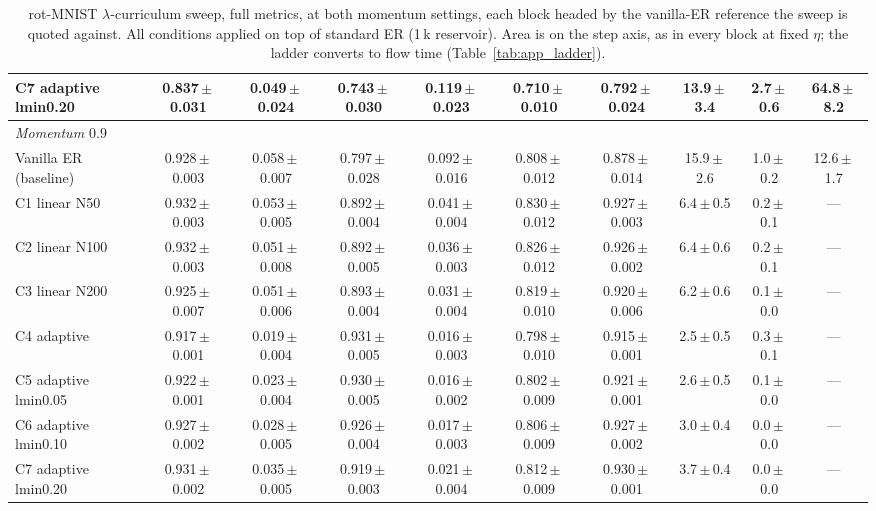 \begin{table}[H]
{\begin{tabular}{l ccc cc c cc c}
            C7 adaptive lmin0.20  & 0.837\,$\pm$\,0.031 & 0.049\,$\pm$\,0.024 & 0.743\,$\pm$\,0.030 & 0.119\,$\pm$\,0.023 & 0.710\,$\pm$\,0.010 & 0.792\,$\pm$\,0.024 & 13.9\,$\pm$\,3.4 & 2.7\,$\pm$\,0.6 & 64.8\,$\pm$\,8.2   \\
            \hline
            \multicolumn{10}{l}{\emph{Momentum $0.9$}}                                                                                                                                                                          \\
            Vanilla ER (baseline) & 0.928\,$\pm$\,0.003 & 0.058\,$\pm$\,0.007 & 0.797\,$\pm$\,0.028 & 0.092\,$\pm$\,0.016 & 0.808\,$\pm$\,0.012 & 0.878\,$\pm$\,0.014 & 15.9\,$\pm$\,2.6 & 1.0\,$\pm$\,0.2 & 12.6\,$\pm$\,1.7   \\
            C1 linear N50         & 0.932\,$\pm$\,0.003 & 0.053\,$\pm$\,0.005 & 0.892\,$\pm$\,0.004 & 0.041\,$\pm$\,0.004 & 0.830\,$\pm$\,0.012 & 0.927\,$\pm$\,0.003 & 6.4\,$\pm$\,0.5  & 0.2\,$\pm$\,0.1 & ---                \\
            C2 linear N100        & 0.932\,$\pm$\,0.003 & 0.051\,$\pm$\,0.008 & 0.892\,$\pm$\,0.005 & 0.036\,$\pm$\,0.003 & 0.826\,$\pm$\,0.012 & 0.926\,$\pm$\,0.002 & 6.4\,$\pm$\,0.6  & 0.2\,$\pm$\,0.1 & ---                \\
            C3 linear N200        & 0.925\,$\pm$\,0.007 & 0.051\,$\pm$\,0.006 & 0.893\,$\pm$\,0.004 & 0.031\,$\pm$\,0.004 & 0.819\,$\pm$\,0.010 & 0.920\,$\pm$\,0.006 & 6.2\,$\pm$\,0.6  & 0.1\,$\pm$\,0.0 & ---                \\
            C4 adaptive           & 0.917\,$\pm$\,0.001 & 0.019\,$\pm$\,0.004 & 0.931\,$\pm$\,0.005 & 0.016\,$\pm$\,0.003 & 0.798\,$\pm$\,0.010 & 0.915\,$\pm$\,0.001 & 2.5\,$\pm$\,0.5  & 0.3\,$\pm$\,0.1 & ---                \\
            C5 adaptive lmin0.05  & 0.922\,$\pm$\,0.001 & 0.023\,$\pm$\,0.004 & 0.930\,$\pm$\,0.005 & 0.016\,$\pm$\,0.002 & 0.802\,$\pm$\,0.009 & 0.921\,$\pm$\,0.001 & 2.6\,$\pm$\,0.5  & 0.1\,$\pm$\,0.0 & ---                \\
            C6 adaptive lmin0.10  & 0.927\,$\pm$\,0.002 & 0.028\,$\pm$\,0.005 & 0.926\,$\pm$\,0.004 & 0.017\,$\pm$\,0.003 & 0.806\,$\pm$\,0.009 & 0.927\,$\pm$\,0.002 & 3.0\,$\pm$\,0.4  & 0.0\,$\pm$\,0.0 & ---                \\
            C7 adaptive lmin0.20  & 0.931\,$\pm$\,0.002 & 0.035\,$\pm$\,0.005 & 0.919\,$\pm$\,0.003 & 0.021\,$\pm$\,0.004 & 0.812\,$\pm$\,0.009 & 0.930\,$\pm$\,0.001 & 3.7\,$\pm$\,0.4  & 0.0\,$\pm$\,0.0 & ---                \\
            \hline
        \end{tabular}%
    }
    \caption{rot-MNIST $\lambda$-curriculum sweep, full metrics, at both momentum settings, each block headed by the vanilla-ER reference the sweep is quoted against. All conditions applied on top of standard ER (1\,k reservoir). Area is on the step axis, as in every block at fixed $\eta$; the ladder converts to flow time (Table~\ref{tab:app_ladder}).}
    \label{tab:app_curr}
\end{table}

